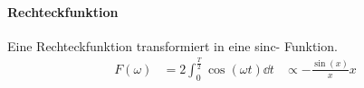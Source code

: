 \paragraph{Rechteckfunktion} Eine Rechteckfunktion transformiert in eine sinc- Funktion.
\begin{align*}
	F(\omega)&=2\int_{0}^{\frac{T}{2}}\cos(\omega t)\dd t&\propto-\frac{\sin(x)}{x}x
\end{align*}

